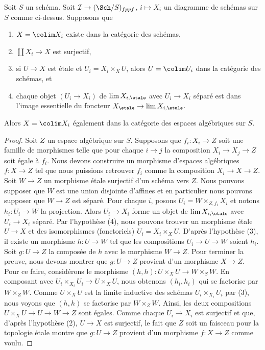 \begin{lemma}
\label{lemma-colimit-agrees}
Soit $S$ un schéma. Soit $\mathcal{I} \to (\Sch/S)_{fppf}$, $i \mapsto X_i$
un diagramme de schémas sur $S$ comme ci-dessus. Supposons que
\begin{enumerate}
\item $X = \colim X_i$ existe dans la catégorie des schémas,
\item $\coprod X_i \to X$ est surjectif,
\item si $U \to X$ est \'etale et $U_i = X_i \times_X U$, alors
$U = \colim U_i$ dans la catégorie des schémas, et
\item chaque objet $(U_i \to X_i)$ de $\lim X_{i, \etale}$
avec $U_i \to X_i$ séparé est dans l'image essentielle du
foncteur $X_\etale \to \lim X_{i, \etale}$.
\end{enumerate}
Alors $X = \colim X_i$ également dans la catégorie des espaces algébriques sur $S$.
\end{lemma}

\begin{proof}
Soit $Z$ un espace algébrique sur $S$. Supposons que $f_i : X_i \to Z$ soit
une famille de morphismes telle que pour chaque $i \to j$ la composition
$X_i \to X_j \to Z$ soit égale à $f_i$. Nous devons construire un morphisme
d'espaces algébriques $f : X \to Z$ tel que nous puissions retrouver $f_i$ comme
la composition $X_i \to X \to Z$. Soit $W \to Z$ un morphisme
\'etale surjectif d'un schéma vers $Z$. Nous pouvons supposer que $W$ est une
union disjointe d'affines et en particulier nous pouvons supposer que
$W \to Z$ est séparé. Pour chaque $i$, posons
$U_i = W \times_{Z, f_i} X_i$ et notons $h_i : U_i \to W$ la projection.
Alors $U_i \to X_i$ forme un objet de $\lim X_{i, \etale}$
avec $U_i \to X_i$ séparé. Par
l'hypothèse (4), nous pouvons trouver un morphisme \'etale $U \to X$ et des isomorphismes (fonctoriels) $U_i = X_i \times_X U$. D'après l'hypothèse (3), il existe un morphisme $h : U \to W$ tel que les compositions $U_i \to U \to W$ soient $h_i$. Soit $g : U \to Z$ la composée de $h$ avec le morphisme $W \to Z$. Pour terminer la preuve, nous devons montrer que $g : U \to Z$ provient d'un morphisme $X \to Z$. Pour ce faire, considérons le morphisme $(h, h) : U \times_X U \to W \times_S W$. En composant avec $U_i \times_{X_i} U_i \to U \times_X U$, nous obtenons $(h_i, h_i)$ qui se factorise par $W \times_Z W$. Comme $U \times_X U$ est la limite inductive des schémas $U_i \times_{X_i} U_i$ par (3), nous voyons que $(h, h)$ se factorise par $W \times_Z W$. Ainsi, les deux compositions $U \times_X U \to U \to W \to Z$ sont égales. Comme chaque $U_i \to X_i$ est surjectif et que, d'après l'hypothèse (2), $U \to X$ est surjectif, le fait que $Z$ soit un faisceau pour la topologie \'etale montre que $g : U \to Z$ provient d'un morphisme $f : X \to Z$ comme voulu.
\end{proof}

